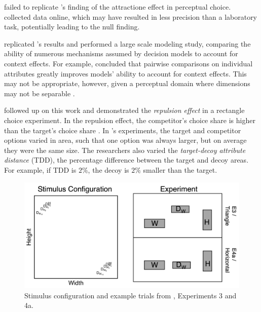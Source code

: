 \textcite{frederickLimitsAttraction2014b} failed to replicate \textcite{trueblood2013not}'s finding of the attractione effect in perceptual choice. \textcite{frederickLimitsAttraction2014b} collected data online, which may have resulted in less precision than a laboratory task, potentially leading to the null finding.

\textcite{turnerCompetingTheoriesMultialternative2018a} replicated \textcite{trueblood2013not}'s results and performed a large scale modeling study, comparing the ability of numerous mechanisms assumed by decision models to account for context effects. For example, \textcite{turnerCompetingTheoriesMultialternative2018a} concluded that pairwise comparisons on individual attributes greatly improves models' ability to account for context effects. This may not be appropriate, however, given a perceptual domain where dimensions may not be separable \parencite{ashbyVarietiesPerceptualIndependence1986a}. 

\textcite{spektorWhenGoodLooks2018b} followed up on this work and demonstrated the \textit{repulsion effect} in a rectangle choice experiment. In the repulsion effect, the competitor's choice share is higher than the target's choice share \parencite{liaoInfluenceDistanceDecoy2021,evansImpactPresentationOrder2021,simonsonVicesVirtuesMisguided2014,frederickLimitsAttraction2014b,spektorRepulsionEffectPreferential2022,banerjeeFactorsThatPromote2024,bhui2021rational}. In \textcite{spektorWhenGoodLooks2018b}'s experiments, the target and competitor options varied in area, such that one option was always larger, but on average they were the same size. The researchers also varied the \textit{target-decoy attribute distance} (TDD), the percentage difference between the target and decoy areas. For example, if TDD is $2\%$, the decoy is $2\%$ smaller than the target. 

\begin{figure}
   \includegraphics[width=\linewidth]{figures/spektor_stim.png}
   \caption{Stimulus configuration and example trials from \textcite{spektorWhenGoodLooks2018b}, Experiments 3 and 4a.}
   \label{fig:spektor_stim}
\end{figure}

